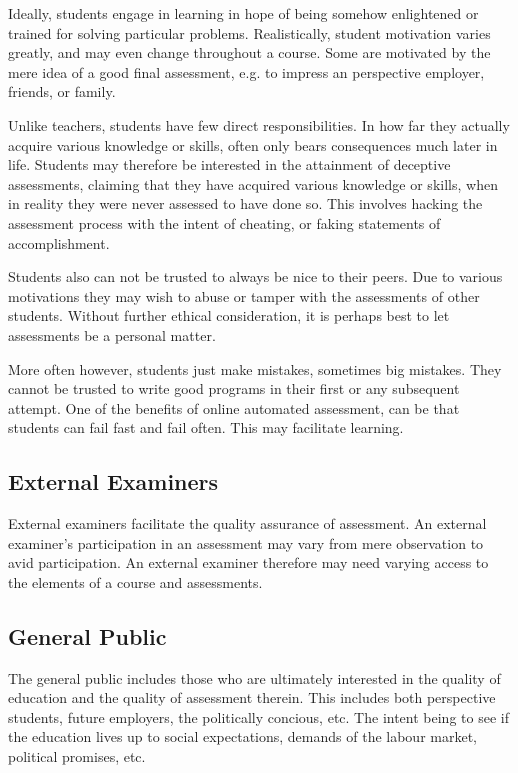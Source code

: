 Ideally, students engage in learning in hope of being somehow enlightened or
trained for solving particular problems. Realistically, student motivation
varies greatly, and may even change throughout a course. Some are motivated by
the mere idea of a good final assessment, e.g. to impress an perspective
employer, friends, or family.

Unlike teachers, students have few direct responsibilities. In how far they
actually acquire various knowledge or skills, often only bears consequences
much later in life. Students may therefore be interested in the attainment of
deceptive assessments, claiming that they have acquired various knowledge or
skills, when in reality they were never assessed to have done so. This involves
hacking the assessment process with the intent of cheating, or faking
statements of accomplishment.

Students also can not be trusted to always be nice to their peers. Due to
various motivations they may wish to abuse or tamper with the assessments of
other students. Without further ethical consideration, it is perhaps best to
let assessments be a personal matter.

More often however, students just make mistakes, sometimes big mistakes. They
cannot be trusted to write good programs in their first or any subsequent
attempt.  One of the benefits of online automated assessment, can be that
students can fail fast and fail often.  This may facilitate learning.

\subsection{External Examiners}

External examiners facilitate the quality assurance of assessment. An external
examiner's participation in an assessment may vary from mere observation to
avid participation. An external examiner therefore may need varying access to
the elements of a course and assessments.

\subsection{General Public}

The general public includes those who are ultimately interested in the quality
of education and the quality of assessment therein. This includes both
perspective students, future employers, the politically concious, etc. The
intent being to see if the education lives up to social expectations, demands
of the labour market, political promises, etc.

